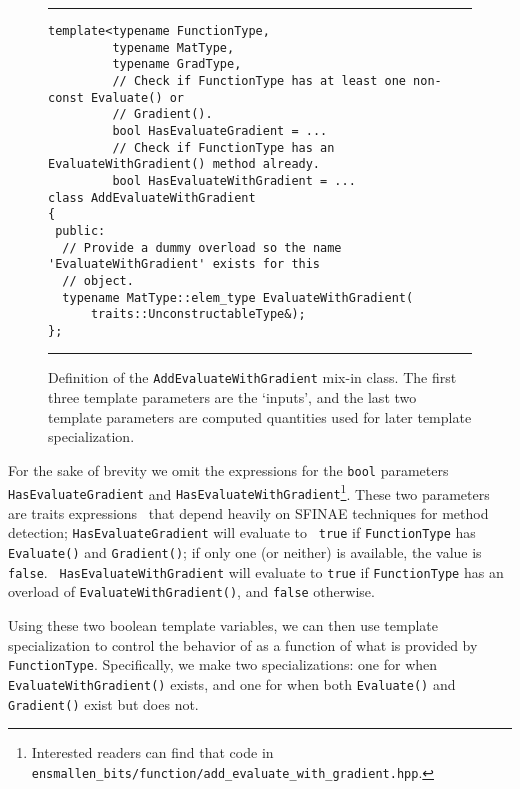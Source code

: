 \begin{figure}[b!]
\hrule
\vspace{1ex}
\begin{verbatim}
template<typename FunctionType,
         typename MatType,
         typename GradType,
         // Check if FunctionType has at least one non-const Evaluate() or
         // Gradient().
         bool HasEvaluateGradient = ...
         // Check if FunctionType has an EvaluateWithGradient() method already.
         bool HasEvaluateWithGradient = ...
class AddEvaluateWithGradient
{
 public:
  // Provide a dummy overload so the name 'EvaluateWithGradient' exists for this
  // object.
  typename MatType::elem_type EvaluateWithGradient(
      traits::UnconstructableType&);
};
\end{verbatim}
\hrule
\vspace*{-0.5em}
\caption{Definition of the {\tt AddEvaluateWithGradient} mix-in class.  The
first three template parameters are the `inputs', and the last two template
parameters are computed quantities used for later template specialization.}
\label{fig:aewg}
\end{figure}

For the sake of brevity we omit the expressions for the {\tt bool} parameters
{\tt HasEvaluateGradient} and {\tt HasEvaluateWithGradient}\footnote{Interested
readers can find that code in {\tt
ensmallen\_bits/function/add\_evaluate\_with\_gradient.hpp}.}.  These two
parameters are traits expressions~\cite{TODO} that depend heavily on SFINAE
techniques for method detection; {\tt HasEvaluateGradient} will evaluate to {\tt
true} if {\tt FunctionType} has {\tt Evaluate()} and {\tt Gradient()}; if only
one (or neither) is available, the value is {\tt false}.  {\tt
HasEvaluateWithGradient} will evaluate to {\tt true} if {\tt FunctionType} has
an overload of {\tt EvaluateWithGradient()}, and {\tt false} otherwise.

Using these two boolean template variables, we can then use template
specialization to control the behavior of  as a function of what is provided by {\tt
FunctionType}.  Specifically, we make two specializations: one for when {\tt
EvaluateWithGradient()} exists, and one for when both {\tt Evaluate()} and {\tt
Gradient()} exist but  does not.

